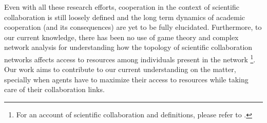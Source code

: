 \documentclass[11pt]{article}
\begin{document}
Even with all these research efforts, cooperation in the context of
scientific collaboration is still loosely defined and the long term
dynamics of academic cooperation (and its consequences) are yet to be
fully elucidated. Furthermore, to our current knowledge, there has
been no use of game theory and complex network analysis for
understanding how the topology of scientific collaboration networks
affects access to resources among individuals present in the network
\footnote{For an account of scientific collaboration and definitions,
  please refer to \cite{Sonnenwald2007}.}. Our work aims to contribute
to our current understanding on the matter, specially when agents have
to maximize their access to resources while taking care of their collaboration links.\\






\end{document}
